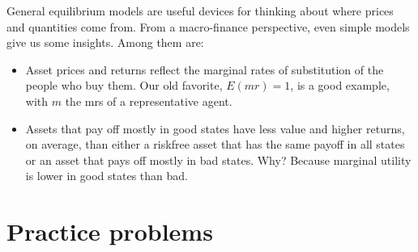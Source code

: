 \documentclass[11pt]{article}
\begin{document}
General equilibrium models are useful devices for thinking
about where prices and quantities come from.
From a macro-finance perspective,
even simple models give us some insights.
Among them are:
%
\begin{itemize}
\item Asset prices and returns reflect the marginal rates of substitution
of the people who buy them.
Our old favorite, $E(mr) = 1$, is a good example, with $m$ 
the mrs of a representative agent.
\item %
Assets that pay off mostly in good states have less value
and higher returns, on average,
than either a riskfree asset that has the same payoff in all states
or an asset that pays off mostly in bad states.
Why?  Because marginal utility is lower in good states than bad.
\end{itemize}

\section*{Practice problems}
\end{document}
